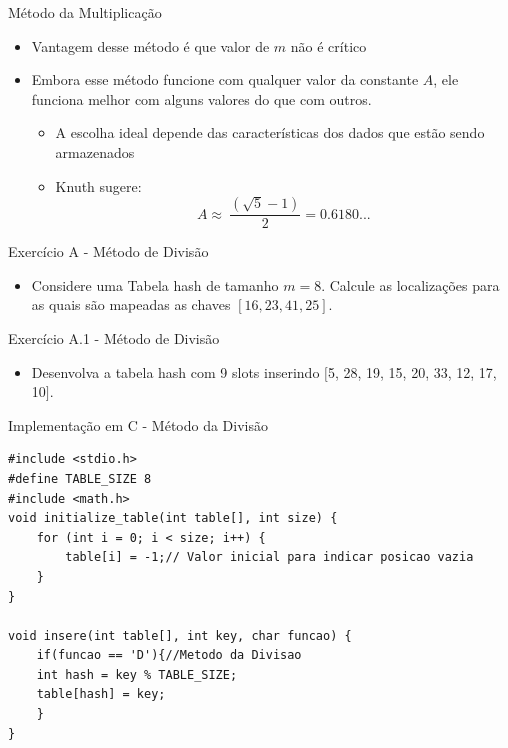 \documentclass{beamer}
\begin{document}
\begin{frame}{Método da Multiplicação}
\begin{itemize}
 \item Vantagem desse método é que valor de $m$ não é crítico
 \item Embora esse método funcione com qualquer valor da constante $A$, ele funciona melhor com alguns valores do que com outros. 
 \begin{itemize}
\item A escolha ideal depende das características dos dados que estão sendo armazenados 
\item Knuth sugere:
$$A \approx \ \dfrac{(\sqrt{5}-1)}{2} = 0.6180...$$
\end{itemize}

\end{itemize}


\end{frame}

\begin{frame}{Exercício A - Método de Divisão}
\begin{itemize}
 \item Considere uma Tabela hash de tamanho $m = 8$. Calcule as localizações para as quais são mapeadas as chaves $[16, 23, 41, 25]$.

\end{itemize}
\end{frame}


\begin{frame}{Exercício A.1 - Método de Divisão}
\begin{itemize}
 \item Desenvolva a tabela hash com 9 slots inserindo $[$5, 28, 19, 15, 20, 33, 12, 17, 10$]$.
\end{itemize}
\end{frame}

\begin{frame}[fragile]{Implementação em C - Método da Divisão}
\footnotesize
\begin{lstlisting}[style=CStyle]
#include <stdio.h>
#define TABLE_SIZE 8
#include <math.h>
void initialize_table(int table[], int size) {
    for (int i = 0; i < size; i++) {
        table[i] = -1;// Valor inicial para indicar posicao vazia
    }
}

void insere(int table[], int key, char funcao) {
    if(funcao == 'D'){//Metodo da Divisao
    int hash = key % TABLE_SIZE;
    table[hash] = key;
    }
}

\end{lstlisting}
\end{frame}
\end{document}
